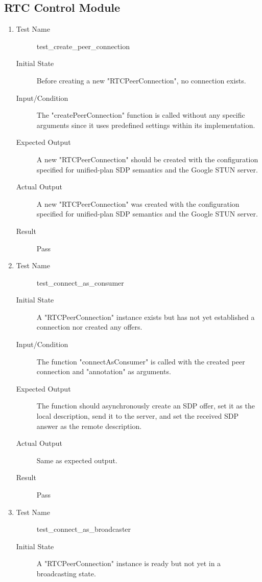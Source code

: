 \documentclass[12pt, titlepage]{article}
\begin{document}
\subsection{RTC Control Module}
\begin{enumerate}[UT-RC1]
  \item \label{UT-RC1}
    \begin{description}
    \item[Test Name] test\_create\_peer\_connection
    \item[Initial State] Before creating a new "RTCPeerConnection", no connection exists.
    \item[Input/Condition] The "createPeerConnection" function is called without any specific arguments since it uses predefined settings within its implementation.
    \item[Expected Output] A new "RTCPeerConnection" should be created with the configuration specified for unified-plan SDP semantics and the Google STUN server.
    \item[Actual Output] A new "RTCPeerConnection" was created with the configuration specified for unified-plan SDP semantics and the Google STUN server.
    \item[Result] Pass
    \end{description}
  \item \label{UT-RC2}
    \begin{description}
    \item[Test Name] test\_connect\_as\_consumer
    \item[Initial State] A "RTCPeerConnection" instance exists but has not yet established a connection nor created any offers.
    \item[Input/Condition] The function "connectAsConsumer" is called with the created peer connection and "annotation" as arguments.
    \item[Expected Output] The function should asynchronously create an SDP offer, set it as the local description, send it to the server, and set the received SDP answer as the remote description.
    \item[Actual Output] Same as expected output.
    \item[Result] Pass
    \end{description}
  \item \label{UT-RC3}
    \begin{description}
    \item[Test Name] test\_connect\_as\_broadcaster
    \item[Initial State]  A "RTCPeerConnection" instance is ready but not yet in a broadcasting state.

\end{description}
\end{enumerate}
\end{document}
